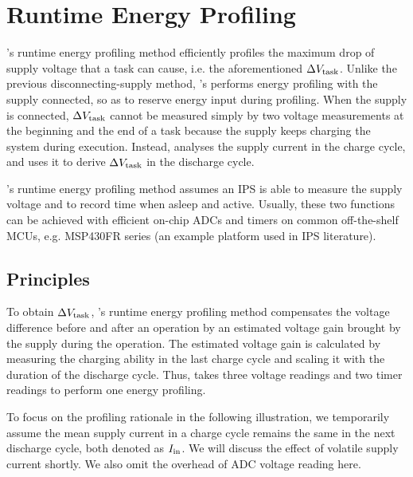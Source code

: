 \section{\nn{} Runtime Energy Profiling} \label{sec:method1}

\nn{}'s runtime energy profiling method efficiently profiles the maximum drop of supply voltage that a task can cause, i.e. the aforementioned $\Delta V_{\text{task}}$. 
Unlike the previous disconnecting-supply method, \nn{}'s performs energy profiling with the supply connected, so as to reserve energy input during profiling.
When the supply is connected, $\Delta V_{\text{task}}$ cannot be measured simply by two voltage measurements at the beginning and the end of a task because the supply keeps charging the system during execution. 
Instead, \nn{} analyses the supply current in the charge cycle, and uses it to derive $\Delta V_{\text{task}}$ in the discharge cycle. 

\nn{}'s runtime energy profiling method assumes an IPS is able to measure the supply voltage and to record time when asleep and active. 
Usually, these two functions can be achieved with efficient on-chip ADCs and timers on common off-the-shelf MCUs, e.g. MSP430FR series (an example platform used in IPS literature). 


\subsection{Principles}

To obtain $\Delta V_{\text{task}}$, \nn{}'s runtime energy profiling method compensates the voltage difference before and after an operation by an estimated voltage gain brought by the supply during the operation.
The estimated voltage gain is calculated by measuring the charging ability in the last charge cycle and scaling it with the duration of the discharge cycle. 
Thus, \nn{} takes three voltage readings and two timer readings to perform one energy profiling. 

To focus on the profiling rationale in the following illustration, we temporarily assume the mean supply current in a charge cycle remains the same in the next discharge cycle, both denoted as $I_{\text{in}}$. 
We will discuss the effect of volatile supply current shortly. 
We also omit the overhead of ADC voltage reading here. 

